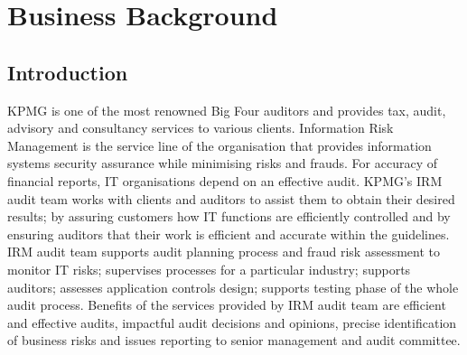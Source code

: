 %
%
%
%

\chapter{Business Background}\label{C.Business.Background}

\section{Introduction}\label{S.intro2}
KPMG is one of the most renowned Big Four auditors and provides tax, audit, advisory and consultancy services to various clients. Information Risk Management is the service line of the organisation that provides information systems security assurance while minimising risks and frauds. For accuracy of financial reports, IT organisations depend on an effective audit. KPMG's IRM audit team works with clients and auditors to assist them to obtain their desired results; by assuring customers how IT functions are efficiently controlled and by ensuring auditors that their work is efficient and accurate within the guidelines. IRM audit team supports audit planning process and fraud risk assessment to monitor IT risks; supervises processes for a particular industry; supports auditors; assesses application controls design; supports testing phase of the whole audit process. Benefits of the services provided by IRM audit team are efficient and effective audits, impactful audit decisions and opinions, precise identification of business risks and issues reporting to senior management and audit committee.\\

